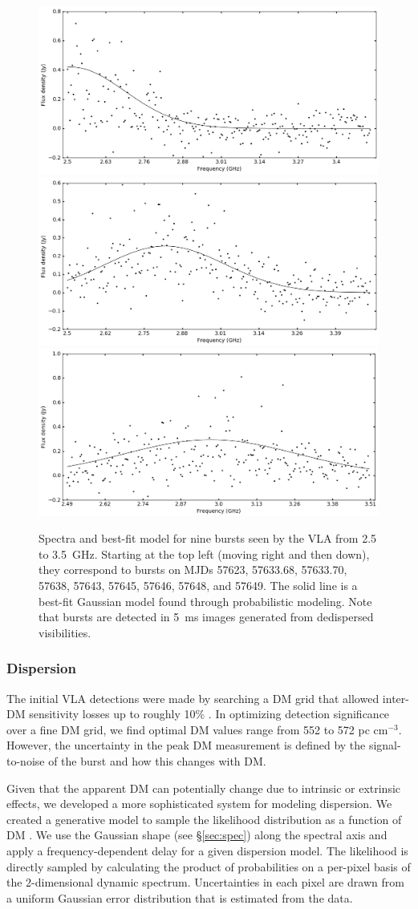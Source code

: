 \documentclass[twocolumn]{aastex61}
\begin{document}
\begin{figure}[ht]
\begin{center}
 \begin{minipage}{2\columnwidth}
  \includegraphics[width=0.33\columnwidth]{spec_57646.png}
  \includegraphics[width=0.33\columnwidth]{spec_57648.png}
  \includegraphics[width=0.33\columnwidth]{spec_57649.png}
 \end{minipage}
\caption{Spectra and best-fit model for nine bursts seen by the VLA from 2.5 to 3.5~GHz. Starting at the top left (moving right and then down), they correspond to bursts on MJDs 57623, 57633.68, 57633.70, 57638, 57643, 57645, 57646, 57648, and 57649. The solid line is a best-fit Gaussian model found through probabilistic modeling. Note that bursts are detected in 5~ms images generated from dedispersed visibilities.
\label{fig:spec}}
\end{center}
\end{figure}

\subsubsection{Dispersion}
The initial VLA detections were made by searching a DM grid that allowed inter-DM sensitivity losses up to roughly 10\% \citep[$\Delta DM=10\ \rm{pc}\ \rm{cm}^{-3}$][]{2003ApJ...596.1142C}. In optimizing detection significance over a fine DM grid, we find optimal DM values range from 552 to 572 pc cm$^{-3}$. However, the uncertainty in the peak DM measurement is defined by the signal-to-noise of the burst and how this changes with DM.

Given that the apparent DM can potentially change due to intrinsic or extrinsic effects, we developed a more sophisticated system for modeling dispersion. We created a generative model to sample the likelihood distribution as a function of DM \citep{2010arXiv1008.4686H}. We use the Gaussian shape (see \S \ref{sec:spec}) along the spectral axis and apply a frequency-dependent delay for a given dispersion model. The likelihood is directly sampled by calculating the product of probabilities on a per-pixel basis of the 2-dimensional dynamic spectrum. Uncertainties in each pixel are drawn from a uniform Gaussian error distribution that is estimated from the data.
\end{document}
